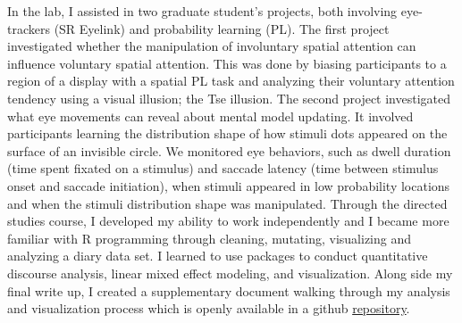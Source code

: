 \documentclass[12pt]{article}
\begin{document}
In the lab, I assisted in two graduate student’s projects, both involving eye-trackers (SR Eyelink) and probability learning (PL). The first project investigated whether the manipulation of involuntary spatial attention can influence voluntary spatial attention. This was done by biasing participants to a region of a display with a spatial PL task and analyzing their voluntary attention tendency using a visual illusion; the Tse illusion. The second project investigated what eye movements can reveal about mental model updating. It involved participants learning the distribution shape of how stimuli dots appeared on the surface of an invisible circle. We monitored eye behaviors, such as dwell duration (time spent fixated on a stimulus) and saccade latency (time between stimulus onset and saccade initiation), when stimuli appeared in low probability locations and when the stimuli distribution shape was manipulated. Through the directed studies course, I developed my ability to work independently and I became more familiar with R programming through cleaning, mutating, visualizing and analyzing a diary data set. I learned to use packages to conduct quantitative discourse analysis, linear mixed effect modeling, and visualization. Along side my final write up, I created a supplementary document walking through my analysis and visualization process which is openly available in a github \href{https://github.com/sjp117/Undergrad_Projects}{repository}.
\end{document}

